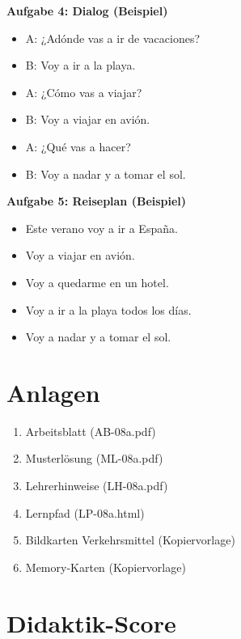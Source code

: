 \documentclass[11pt,a4paper]{article}
\begin{document}
\textbf{Aufgabe 4: Dialog (Beispiel)}
\begin{itemize}
    \item A: ¿Adónde vas a ir de vacaciones?
    \item B: Voy a ir a la playa.
    \item A: ¿Cómo vas a viajar?
    \item B: Voy a viajar en avión.
    \item A: ¿Qué vas a hacer?
    \item B: Voy a nadar y a tomar el sol.
\end{itemize}

\textbf{Aufgabe 5: Reiseplan (Beispiel)}
\begin{itemize}
    \item Este verano voy a ir a España.
    \item Voy a viajar en avión.
    \item Voy a quedarme en un hotel.
    \item Voy a ir a la playa todos los días.
    \item Voy a nadar y a tomar el sol.
\end{itemize}

\section{Anlagen}

\begin{enumerate}
    \item Arbeitsblatt (AB-08a.pdf)
    \item Musterlösung (ML-08a.pdf)
    \item Lehrerhinweise (LH-08a.pdf)
    \item Lernpfad (LP-08a.html)
    \item Bildkarten Verkehrsmittel (Kopiervorlage)
    \item Memory-Karten (Kopiervorlage)
\end{enumerate}

\newpage
\section{Didaktik-Score}
\end{document}
